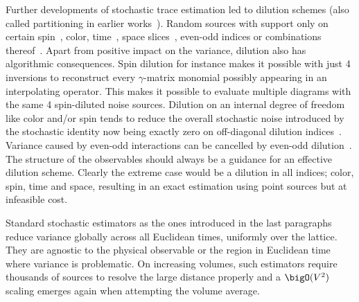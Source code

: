 Further developments of stochastic trace estimation led to dilution schemes (also called partitioning in earlier works~\cite{Wilcox:1999ab}).
Random sources with support only on certain spin~\cite{Wilcox:1997rm,Alexandrou:2010jr}, color, time~\cite{GUSKEN1989,OCais:2004xgm,Bali:2014pva}, space slices~\cite{Foley:2005ac}, even-odd indices or combinations thereof~\cite{Morningstar:2008mc,Bulava:2008qx,Foley:2010vv,Morningstar:2008ph}.
Apart from positive impact on the variance, dilution also has algorithmic consequences.
Spin dilution for instance makes it possible with just \num{4} inversions to reconstruct every $\gamma$-matrix monomial possibly appearing in an interpolating operator.
This makes it possible to evaluate multiple diagrams with the same \num{4} spin-diluted noise sources.
Dilution on an internal degree of freedom like color and/or spin tends to reduce the overall stochastic noise introduced by the stochastic identity now being exactly zero on off-diagonal dilution indices~\cite{Babich:2010at,Morningstar:2011ka}.
Variance caused by even-odd interactions can be cancelled by even-odd dilution~\cite{Bali_2009,Foley:2005ac,Morningstar:2011ka}.
The structure of the observables should always be a guidance for an effective dilution scheme.
Clearly the extreme case would be a dilution in all indices; color, spin, time and space, resulting in an exact estimation using point sources but at infeasible cost.

Standard stochastic estimators as the ones introduced in the last paragraphs reduce variance globally across all Euclidean times, \ie uniformly over the lattice.
They are agnostic to the physical observable or the region in Euclidean time where variance is problematic.
On increasing volumes, such estimators require thousands of sources to resolve the large distance properly and a $\bigO(V^{2})$ scaling emerges again when attempting the volume average.

